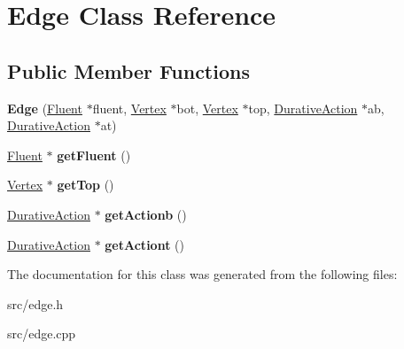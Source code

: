 \hypertarget{classEdge}{\section{Edge Class Reference}
\label{classEdge}
}
\subsection*{Public Member Functions}
\begin{DoxyCompactItemize}
\item 
\hypertarget{classEdge_a2aa01b8e31fbbceefddd37a8871ff49a}{{\bfseries Edge} (\hyperlink{classFluent}{Fluent} $\ast$fluent, \hyperlink{classVertex}{Vertex} $\ast$bot, \hyperlink{classVertex}{Vertex} $\ast$top, \hyperlink{classDurativeAction}{Durative\+Action} $\ast$ab, \hyperlink{classDurativeAction}{Durative\+Action} $\ast$at)}\label{classEdge_a2aa01b8e31fbbceefddd37a8871ff49a}

\item 
\hypertarget{classEdge_aee5e050628d508a374b8154273832d04}{\hyperlink{classFluent}{Fluent} $\ast$ {\bfseries get\+Fluent} ()}\label{classEdge_aee5e050628d508a374b8154273832d04}

\item 
\hypertarget{classEdge_ad3e5cf45c737d4bc5a17765731e6da47}{\hyperlink{classVertex}{Vertex} $\ast$ {\bfseries get\+Top} ()}\label{classEdge_ad3e5cf45c737d4bc5a17765731e6da47}

\item 
\hypertarget{classEdge_aca4aee9abfe35c3c228bad72b4a41d53}{\hyperlink{classDurativeAction}{Durative\+Action} $\ast$ {\bfseries get\+Actionb} ()}\label{classEdge_aca4aee9abfe35c3c228bad72b4a41d53}

\item 
\hypertarget{classEdge_aa9a940d14c08559447851979db0bac53}{\hyperlink{classDurativeAction}{Durative\+Action} $\ast$ {\bfseries get\+Actiont} ()}\label{classEdge_aa9a940d14c08559447851979db0bac53}

\end{DoxyCompactItemize}


The documentation for this class was generated from the following files\+:\begin{DoxyCompactItemize}
\item 
src/edge.\+h\item 
src/edge.\+cpp\end{DoxyCompactItemize}
